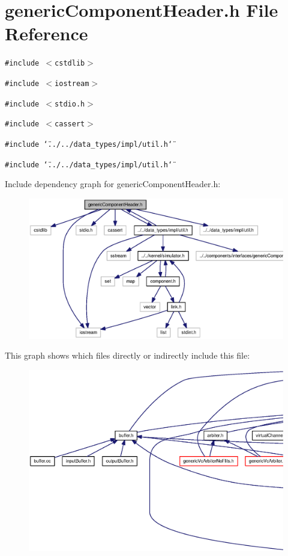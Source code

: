 \section{genericComponentHeader.h File Reference}
\label{genericComponentHeader_8h}
{\tt \#include $<$cstdlib$>$}\par
{\tt \#include $<$iostream$>$}\par
{\tt \#include $<$stdio.h$>$}\par
{\tt \#include $<$cassert$>$}\par
{\tt \#include \char`\"{}../../data\_\-types/impl/util.h\char`\"{}}\par
{\tt \#include \char`\"{}../../data\_\-types/impl/util.h\char`\"{}}\par


Include dependency graph for genericComponentHeader.h:\nopagebreak
\begin{figure}[H]
\begin{center}
\leavevmode
\includegraphics[width=331pt]{genericComponentHeader_8h__incl}
\end{center}
\end{figure}


This graph shows which files directly or indirectly include this file:\nopagebreak
\begin{figure}[H]
\begin{center}
\leavevmode
\includegraphics[width=420pt]{genericComponentHeader_8h__dep__incl}
\end{center}
\end{figure}
